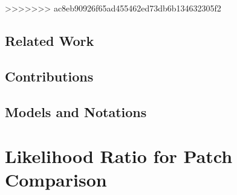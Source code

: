 \documentclass[runningheads]{llncs}
\begin{document}
>>>>>>> ac8eb90926f65ad455462ed73db6b134632305f2
\subsection{Related Work}

\subsection{Contributions}

\subsection{Models and Notations}


\section{Likelihood Ratio for Patch Comparison}
\end{document}
